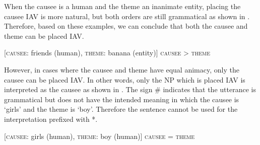 \documentclass[output=paper,
            colorlinks, citecolor=brown
            ,draftmode
		  ]{langscibook}
\begin{document}
When the causee is a human and the theme an inanimate entity, placing the causee IAV is more natural, but both orders are still grammatical as shown in . Therefore, based on these examples, we can conclude that both the causee and theme can be placed IAV.    



\ea%
    \label{ex:yoneda:15}
    [\textsc{causee}: friends (human), \textsc{theme}: banana (entity)]  \textsc{causee} > \textsc{theme}
    \z 
\z


        

    However, in cases where the causee and theme have equal animacy, only the causee can be placed IAV. In other words, only the NP which is placed IAV is interpreted as the causee as shown in . The sign \# indicates that the utterance is grammatical but does not have the intended meaning in which the causee is ‘girls’ and the theme is ‘boy’. Therefore the sentence cannot be used for the interpretation prefixed with *.

\ea%
    \label{ex:yoneda:16}
    [\textsc{causee}: girls (human), \textsc{theme}: boy (human)]  \textsc{causee} = \textsc{theme}
    \z
\z    
\end{document}
